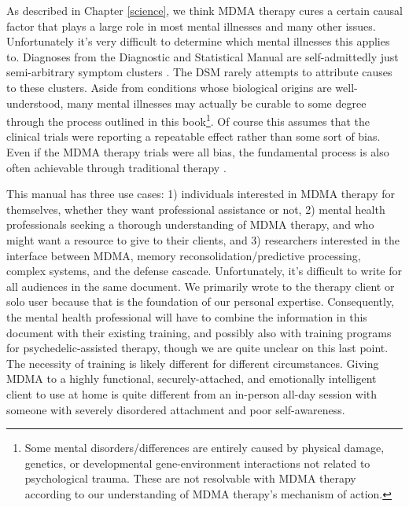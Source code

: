 \documentclass[12pt,letterpaper]{book}
\begin{document}

As described in Chapter \ref{science}, we think MDMA therapy cures a certain causal factor that plays a large role in most mental illnesses and many other issues. Unfortunately it's very difficult to determine which mental illnesses this applies to. Diagnoses from the Diagnostic and Statistical Manual are self-admittedly just semi-arbitrary symptom clusters \cite{apaDSM}. The DSM rarely attempts to attribute causes to these clusters. Aside from conditions whose biological origins are well-understood, many mental illnesses may actually be curable to some degree through the process outlined in this book\footnote{Some mental disorders/differences are entirely caused by physical damage, genetics, or developmental gene-environment interactions not related to psychological trauma. These are not resolvable with MDMA therapy according to our understanding of MDMA therapy's mechanism of action.}. Of course this assumes that the clinical trials were reporting a repeatable effect rather than some sort of bias. Even if the MDMA therapy trials were all bias, the fundamental process is also often achievable through traditional therapy \cite{eckerUnlocking}.

This manual has three use cases: 1) individuals interested in MDMA therapy for themselves, whether they want professional assistance or not, 2) mental health professionals seeking a thorough understanding of MDMA therapy, and who might want a resource to give to their clients, and 3) researchers interested in the interface between MDMA, memory reconsolidation/predictive processing, complex systems, and the defense cascade. Unfortunately, it's difficult to write for all audiences in the same document. We primarily wrote to the therapy client or solo user because that is the foundation of our personal expertise. Consequently, the mental health professional will have to combine the information in this document with their existing training, and possibly also with training programs for psychedelic-assisted therapy, though we are quite unclear on this last point. The necessity of training is likely different for different circumstances. Giving MDMA to a highly functional, securely-attached, and emotionally intelligent client to use at home is quite different from an in-person all-day session with someone with severely disordered attachment and poor self-awareness.
\end{document}

